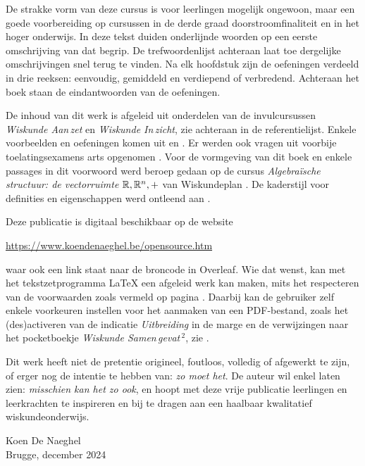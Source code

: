 \documentclass{ximera}
\begin{document}
De strakke vorm van deze cursus is voor leerlingen mogelijk ongewoon, maar een goede voorbereiding op cursussen in de derde graad doorstroomfinaliteit en in het hoger onderwijs. In deze tekst duiden onderlijnde woorden op een eerste omschrijving van dat begrip. De trefwoordenlijst achteraan laat toe dergelijke omschrijvingen snel terug te vinden. Na elk hoofdstuk zijn de oefeningen verdeeld in drie reeksen: eenvoudig, gemiddeld en verdiepend of verbredend. Achteraan het boek staan de eindantwoorden van de oefeningen.

De inhoud van dit werk is afgeleid uit onderdelen van de invulcursussen {\em Wiskunde Aan\,zet} en {\em Wiskunde In\,zicht}, zie \cite{waz,wiz} achteraan in de referentielijst. Enkele voorbeelden en oefeningen komen uit \cite{TAOPS-intalg} en \cite{Dhont}. Er werden ook vragen uit voorbije toelatingsexamens arts opgenomen \cite{toelatingsexamens}. Voor de vormgeving van dit boek en enkele passages in dit voorwoord werd beroep gedaan op de cursus {\em Algebra\"ische structuur: de vectorruimte $\mathbb{R},\mathbb{R}^n,+$} van Wiskundeplan \cite{Wiskundeplan:cursus}. De kaderstijl voor definities en eigenschappen werd ontleend aan \cite{Kuijpers}. 

Deze publicatie is digitaal beschikbaar op de website 
\begin{center}
\url{https://www.koendenaeghel.be/opensource.htm}
\end{center}
waar ook een link staat naar de broncode in Overleaf. Wie dat wenst, kan met het tekstzetprogramma \LaTeX{} een afgeleid werk kan maken, mits het respecteren van de voorwaarden zoals vermeld op pagina \pageref{rechten}.
Daarbij kan de gebruiker zelf enkele voorkeuren instellen voor het aanmaken van een PDF-bestand, zoals het (des)activeren van de indicatie \textit{Uitbreiding} in de marge en de verwijzingen naar het pocketboekje {\em Wiskunde Samen\,gevat\,${}^{2}$}, zie \cite{wsg}. 

Dit werk heeft niet de pretentie origineel, foutloos, volledig of afgewerkt te zijn, of erger nog de intentie te hebben van: {\em zo moet het}. De auteur wil enkel laten zien: {\em misschien kan het zo ook}, en hoopt met deze vrije publicatie leerlingen en leerkrachten te inspireren en bij te dragen aan een haalbaar kwalitatief wiskundeonderwijs.

\vfill{
\begin{flushright}
Koen De Naeghel \\
Brugge, december 2024
\end{flushright}
}
\end{document}
